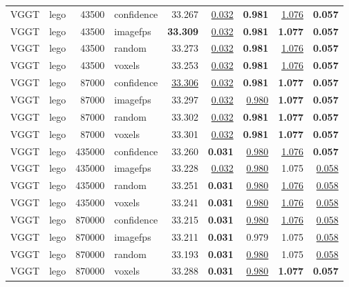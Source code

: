 \begin{table}[H]
\begin{tabular}{llrlrrrrr}
VGGT & lego & 43500 & confidence & 33.267 & \underline{0.032} & \textbf{0.981} & \underline{1.076} & \textbf{0.057} \\
VGGT & lego & 43500 & imagefps & \textbf{33.309} & \underline{0.032} & \textbf{0.981} & \textbf{1.077} & \textbf{0.057} \\
VGGT & lego & 43500 & random & 33.273 & \underline{0.032} & \textbf{0.981} & \underline{1.076} & \textbf{0.057} \\
VGGT & lego & 43500 & voxels & 33.253 & \underline{0.032} & \textbf{0.981} & \underline{1.076} & \textbf{0.057} \\
VGGT & lego & 87000 & confidence & \underline{33.306} & \underline{0.032} & \textbf{0.981} & \textbf{1.077} & \textbf{0.057} \\
VGGT & lego & 87000 & imagefps & 33.297 & \underline{0.032} & \underline{0.980} & \textbf{1.077} & \textbf{0.057} \\
VGGT & lego & 87000 & random & 33.302 & \underline{0.032} & \textbf{0.981} & \textbf{1.077} & \textbf{0.057} \\
VGGT & lego & 87000 & voxels & 33.301 & \underline{0.032} & \textbf{0.981} & \textbf{1.077} & \textbf{0.057} \\
VGGT & lego & 435000 & confidence & 33.260 & \textbf{0.031} & \underline{0.980} & \underline{1.076} & \textbf{0.057} \\
VGGT & lego & 435000 & imagefps & 33.228 & \underline{0.032} & \underline{0.980} & 1.075 & \underline{0.058} \\
VGGT & lego & 435000 & random & 33.251 & \textbf{0.031} & \underline{0.980} & \underline{1.076} & \underline{0.058} \\
VGGT & lego & 435000 & voxels & 33.241 & \textbf{0.031} & \underline{0.980} & \underline{1.076} & \underline{0.058} \\
VGGT & lego & 870000 & confidence & 33.215 & \textbf{0.031} & \underline{0.980} & \underline{1.076} & \underline{0.058} \\
VGGT & lego & 870000 & imagefps & 33.211 & \textbf{0.031} & 0.979 & 1.075 & \underline{0.058} \\
VGGT & lego & 870000 & random & 33.193 & \textbf{0.031} & \underline{0.980} & 1.075 & \underline{0.058} \\
VGGT & lego & 870000 & voxels & 33.288 & \textbf{0.031} & \underline{0.980} & \textbf{1.077} & \textbf{0.057} \\
\bottomrule
\end{tabular}
\end{table}
